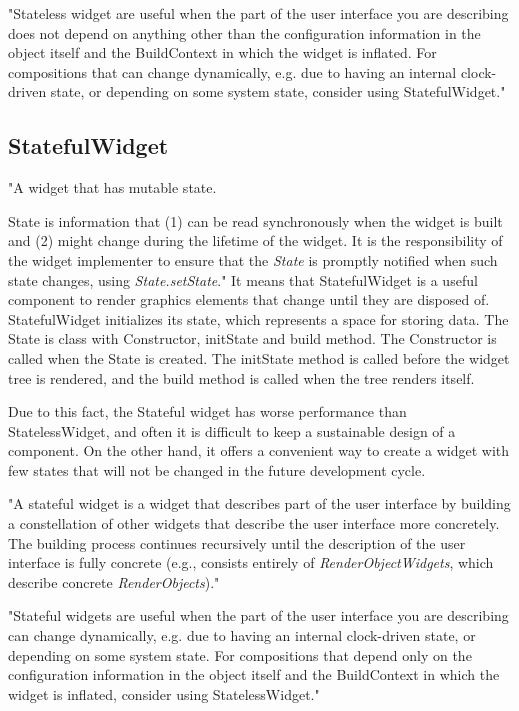 "Stateless widget are useful when the part of the user interface you are describing does not depend on anything other than the configuration information in the object itself and the BuildContext in which the widget is inflated.
For compositions that can change dynamically, e.g. due to having an internal clock-driven state, or depending on some system state, consider using StatefulWidget."\cite{statelessWidget}


\subsection{StatefulWidget}\label{subsec:statefulwidget}
"A widget that has mutable state.

State is information that (1) can be read synchronously when the widget is built and (2) might change during the lifetime of the widget.
It is the responsibility of the widget implementer to ensure that the \textit{State}\cite{state} is promptly notified when such state changes, using \textit{State.setState}\cite{setState}."\cite{statefulWidget}
It means that StatefulWidget is a useful component to render graphics elements that change until they are disposed of.
StatefulWidget initializes its state, which represents a space for storing data.
The State is class with Constructor, initState and build method.
The Constructor is called when the State is created.
The initState method is called before the widget tree is rendered, and the build method is called when the tree renders itself.

Due to this fact, the Stateful widget has worse performance than StatelessWidget, and often it is difficult to keep a sustainable design of a component.
On the other hand, it offers a convenient way to create a widget with few states that will not be changed in the future development cycle.

"A stateful widget is a widget that describes part of the user interface by building a constellation of other widgets that describe the user interface more concretely.
The building process continues recursively until the description of the user interface is fully concrete (e.g., consists entirely of
\textit{RenderObjectWidgets}\cite{renderObjectWidget}, which describe concrete \textit{RenderObjects}\cite{renderObject})."\cite{statefulWidget}


"Stateful widgets are useful when the part of the user interface you are describing can change dynamically, e.g. due to having an internal clock-driven state, or depending on some system state.
For compositions that depend only on the configuration information in the object itself and the BuildContext in which the widget is inflated, consider using StatelessWidget."\cite{statefulWidget}


